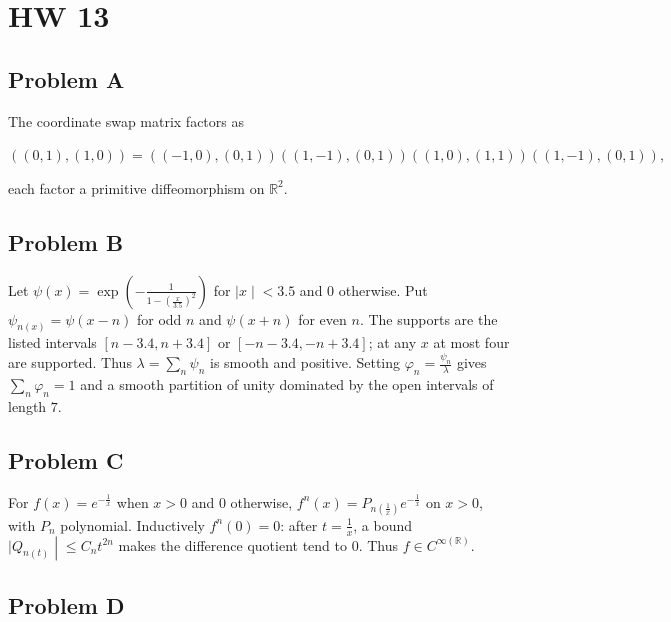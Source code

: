 \chapter{HW 13}

\section{Problem A}

The coordinate swap matrix factors as

\(\left( {\left( {0,1} \right),\left( {1,0} \right)} \right) = \left( {\left( {- 1,0} \right),\left( {0,1} \right)} \right)\left( {\left( {1, - 1} \right),\left( {0,1} \right)} \right)\left( {\left( {1,0} \right),\left( {1,1} \right)} \right)\left( {\left( {1, - 1} \right),\left( {0,1} \right)} \right),\)

each factor a primitive diffeomorphism on \(\mathbb{R}^{2}\).

\section{Problem B}

Let \(\psi(x) = \exp\left( {- \frac{1}{1 - \left( \frac{x}{3.5} \right)^{2}}} \right)\) for \(\left. |x \middle| < 3.5 \right.\) and \(0\) otherwise. Put \(\psi_{n{(x)}} = \psi\left( {x - n} \right)\) for odd \(n\) and \(\psi\left( {x + n} \right)\) for even \(n\). The supports are the listed intervals \(\left\lbrack {n - 3.4,n + 3.4} \right\rbrack\) or \(\left\lbrack {- n - 3.4, - n + 3.4} \right\rbrack\); at any \(x\) at most four are supported. Thus \(\lambda = \sum_{n}\psi_{n}\) is smooth and positive. Setting \(\varphi_{n} = \frac{\psi_{n}}{\lambda}\) gives \(\sum_{n}\varphi_{n} = 1\) and a smooth partition of unity dominated by the open intervals of length \(7\).

\section{Problem C}

For \(f(x) = e^{- \frac{1}{x}}\) when \(x > 0\) and \(0\) otherwise, \(f^{n}(x) = P_{n{(\frac{1}{x})}}e^{- \frac{1}{x}}\) on \(x > 0\), with \(P_{n}\) polynomial. Inductively \(f^{n}(0) = 0\): after \(t = \frac{1}{x}\), a bound \(\left. |Q_{n{(t)}} \middle| \leq C_{n}t^{2n} \right.\) makes the difference quotient tend to \(0\). Thus \(f \in C^{\infty{(\mathbb{R})}}\).

\section{Problem D}

